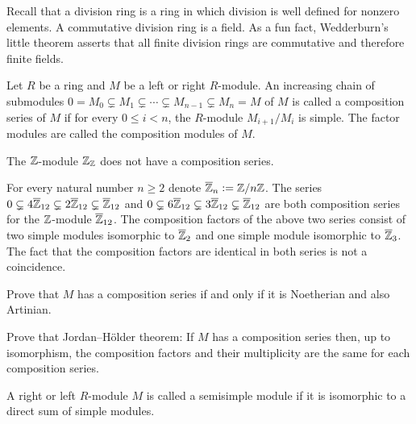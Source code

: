 \documentclass[11pt,a4paper]{article}
\begin{document}
\begin{remark}
  Recall that a division ring is a ring in which division is well defined for nonzero
  elements.
  A commutative division ring is a field.
  As a fun fact, Wedderburn's little theorem asserts that all finite division rings
  are commutative and therefore finite fields.
\end{remark}

\begin{definition}
  Let $R$ be a ring and $M$ be a left or right $R$-module.
  An increasing chain of submodules
  $0 = M_0 \subsetneq M_1 \subsetneq \cdots \subsetneq M_{n-1} \subsetneq M_n = M$ 
  of $M$ is called a composition series of $M$ if for every $0 \le i < n$,
  the $R$-module $M_{i+1}/M_i$ is simple.
  The factor modules are called the composition modules of $M$.
\end{definition}

\begin{example}
  The $\mathbb{Z}$-module $\mathbb{Z}_{\mathbb{Z}}$ does not have a composition series.
\end{example}

\begin{example}
  For every natural number $n \geq 2$ denote $\overline {\mathbb{Z}}_n := \mathbb{Z}/n\mathbb{Z}$.
  The series $0 \subsetneq 4 \overline {\mathbb{Z}}_{12} \subsetneq 2 \overline {\mathbb{Z}}_{12} \subsetneq
  \overline {\mathbb{Z}}_{12}$ and
  $0 \subsetneq 6 \overline {\mathbb{Z}}_{12} \subsetneq 3 \overline {\mathbb{Z}}_{12} \subsetneq
  \overline {\mathbb{Z}}_{12}$ are both composition series for the $\mathbb{Z}$-module $\overline {\mathbb{Z}}_{12}$.
  The composition factors of the above two series consist of two simple modules isomorphic
  to $\overline {\mathbb{Z}}_{2}$ and one simple module isomorphic to $\overline {\mathbb{Z}}_{3}$.
  The fact that the composition factors are identical in both series is not a coincidence.
\end{example}

\begin{exercise}
  Prove that $M$ has a composition series if and only if it is Noetherian
  and also Artinian.
\end{exercise}

\begin{exercise}
  Prove that Jordan--H\"older theorem:
  If $M$ has a composition series then, up to isomorphism,
  the composition factors and their multiplicity are the same for each
  composition series.
\end{exercise}

\begin{definition}
  A right or left $R$-module $M$ is called a semisimple module if it is isomorphic
  to a direct sum of simple modules.
\end{definition}
\end{document}
